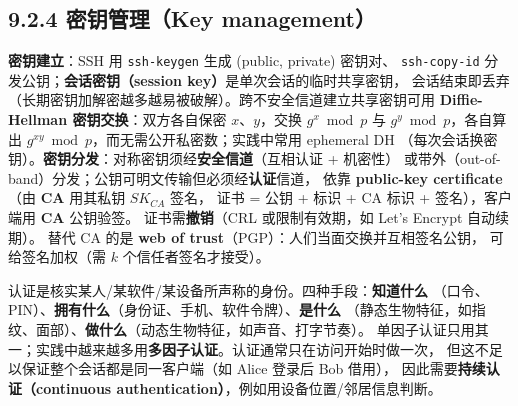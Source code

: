 \begin{closeread}
\end{closeread}


\subsection*{9.2.4 密钥管理（Key management）}
\textbf{密钥建立}：SSH 用 \texttt{ssh-keygen} 生成 (public, private) 密钥对、
\texttt{ssh-copy-id} 分发公钥；\textbf{会话密钥（session key）}是单次会话的临时共享密钥，
会话结束即丢弃（长期密钥加解密越多越易被破解）。跨不安全信道建立共享密钥可用
\textbf{Diffie-Hellman 密钥交换}：双方各自保密 $x$、$y$，交换 $g^x \bmod p$ 与
$g^y \bmod p$，各自算出 $g^{xy} \bmod p$，而无需公开私密数；实践中常用 ephemeral DH
（每次会话换密钥）。\textbf{密钥分发}：对称密钥须经\textbf{安全信道}（互相认证 + 机密性）
或带外（out-of-band）分发；公钥可明文传输但必须经\textbf{认证}信道，
依靠 \textbf{public-key certificate}（由 \textbf{CA} 用其私钥 $SK_{CA}$ 签名，
证书 = 公钥 + 标识 + CA 标识 + 签名），客户端用 \textbf{CA} 公钥验签。
证书需\textbf{撤销}（CRL 或限制有效期，如 Let's Encrypt 自动续期）。
替代 CA 的是 \textbf{web of trust}（PGP）：人们当面交换并互相签名公钥，
可给签名加权（需 $k$ 个信任者签名才接受）。

\begin{closeread}
\end{closeread}



认证是核实某人/某软件/某设备所声称的身份。四种手段：\textbf{知道什么}
（口令、PIN）、\textbf{拥有什么}（身份证、手机、软件令牌）、\textbf{是什么}
（静态生物特征，如指纹、面部）、\textbf{做什么}（动态生物特征，如声音、打字节奏）。
单因子认证只用其一；实践中越来越多用\textbf{多因子认证}。认证通常只在访问开始时做一次，
但这不足以保证整个会话都是同一客户端（如 Alice 登录后 Bob 借用），
因此需要\textbf{持续认证（continuous authentication）}，例如用设备位置/邻居信息判断。

